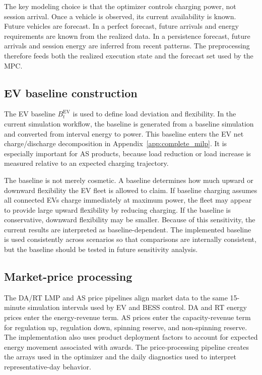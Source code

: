 \documentclass[final,5p,times]{elsarticle}
\newcommand{\EV}{\mathrm{EV}}
\begin{document}
The key modeling choice is that the optimizer controls charging power, not session arrival. Once a vehicle is observed, its current availability is known. Future vehicles are forecast. In a perfect forecast, future arrivals and energy requirements are known from the realized data. In a persistence forecast, future arrivals and session energy are inferred from recent patterns. The preprocessing therefore feeds both the realized execution state and the forecast set used by the MPC.

\subsection{EV baseline construction}
The EV baseline $B_t^{\EV}$ is used to define load deviation and flexibility. In the current simulation workflow, the baseline is generated from a baseline simulation and converted from interval energy to power. This baseline enters the EV net charge/discharge decomposition in Appendix~\ref{app:complete_milp}. It is especially important for AS products, because load reduction or load increase is measured relative to an expected charging trajectory.

The baseline is not merely cosmetic. A baseline determines how much upward or downward flexibility the EV fleet is allowed to claim. If baseline charging assumes all connected EVs charge immediately at maximum power, the fleet may appear to provide large upward flexibility by reducing charging. If the baseline is conservative, downward flexibility may be smaller. Because of this sensitivity, the current results are interpreted as baseline-dependent. The implemented baseline is used consistently across scenarios so that comparisons are internally consistent, but the baseline should be tested in future sensitivity analysis.

\subsection{Market-price processing}
The DA/RT LMP and AS price pipelines align market data to the same 15-minute simulation intervals used by EV and BESS control. DA and RT energy prices enter the energy-revenue term. AS prices enter the capacity-revenue term for regulation up, regulation down, spinning reserve, and non-spinning reserve. The implementation also uses product deployment factors to account for expected energy movement associated with awards. The price-processing pipeline creates the arrays used in the optimizer and the daily diagnostics used to interpret representative-day behavior.
\end{document}
